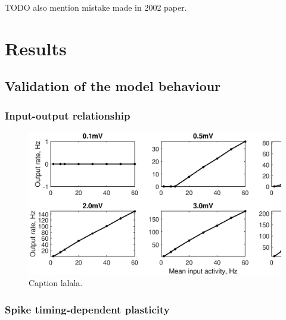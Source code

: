 \documentclass[a4paper,12pt]{report}
\theoremstyle{definition}
\begin{document}
TODO also mention mistake made in 2002 paper.











\chapter{Results}
\section{Validation of the model behaviour}




\subsection{Input-output relationship}
\begin{figure}[h]
    \includegraphics[width=\textwidth]{figures/valid_iocurve_vs_epsp_grid.eps}
    \caption{Caption lalala.}
    \label{fig:valid_iocurve_vs_epsp_grid}
\end{figure}




\subsection{Spike timing-dependent plasticity}
\end{document}
